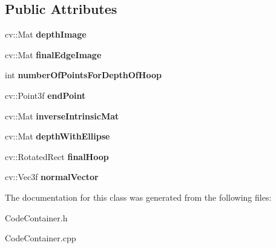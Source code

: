 \subsection*{Public Attributes}
\begin{DoxyCompactItemize}
\item 
\hypertarget{classCodeContainer_aa6268e4b294280a596d72da042c2f582}{
cv::Mat {\bfseries depthImage}}
\label{classCodeContainer_aa6268e4b294280a596d72da042c2f582}

\item 
\hypertarget{classCodeContainer_a229e9d396276f358aabfd2b7a6a53b3e}{
cv::Mat {\bfseries finalEdgeImage}}
\label{classCodeContainer_a229e9d396276f358aabfd2b7a6a53b3e}

\item 
\hypertarget{classCodeContainer_aa12596e2d7e30c08100432c0d18cf69a}{
int {\bfseries numberOfPointsForDepthOfHoop}}
\label{classCodeContainer_aa12596e2d7e30c08100432c0d18cf69a}

\item 
\hypertarget{classCodeContainer_a96641a7de273d8e6fa5f5cf4406e0d2b}{
cv::Point3f {\bfseries endPoint}}
\label{classCodeContainer_a96641a7de273d8e6fa5f5cf4406e0d2b}

\item 
\hypertarget{classCodeContainer_a2796c5ce77f7d63291f88078d31cf631}{
cv::Mat {\bfseries inverseIntrinsicMat}}
\label{classCodeContainer_a2796c5ce77f7d63291f88078d31cf631}

\item 
\hypertarget{classCodeContainer_a10df0c24294bf834a4abbc3245466b79}{
cv::Mat {\bfseries depthWithEllipse}}
\label{classCodeContainer_a10df0c24294bf834a4abbc3245466b79}

\item 
\hypertarget{classCodeContainer_ac814724bf2639a7c0bb70c498a042c48}{
cv::RotatedRect {\bfseries finalHoop}}
\label{classCodeContainer_ac814724bf2639a7c0bb70c498a042c48}

\item 
\hypertarget{classCodeContainer_af877d6a77e8703aab567c1e354c51309}{
cv::Vec3f {\bfseries normalVector}}
\label{classCodeContainer_af877d6a77e8703aab567c1e354c51309}

\end{DoxyCompactItemize}


The documentation for this class was generated from the following files:\begin{DoxyCompactItemize}
\item 
CodeContainer.h\item 
CodeContainer.cpp\end{DoxyCompactItemize}
